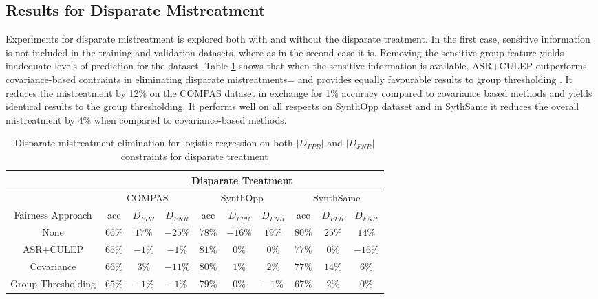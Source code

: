 \documentclass[runningheads]{llncs}
\begin{document}
\subsection{Results for Disparate Mistreatment}
Experiments for disparate mistreatment is explored both with and without the disparate treatment. In the first case, sensitive information is not included in the training and validation datasets, where as in the second case it is. Removing the sensitive group feature yields inadequate levels of prediction for the dataset. Table \ref{tab:disptreatmenttable} shows that when the sensitive information is available, ASR+CULEP outperforms covariance-based contraints in eliminating disparate mistreatments= and provides equally favourable results to group thresholding \cite{krasanakis2018adaptive}. It reduces the mistreatment by 12\% on the COMPAS dataset in exchange for 1\% accuracy compared to covariance based methods and yields identical results to the group thresholding. It performs well on all respects on SynthOpp dataset and in SythSame it reduces the overall mistreatment by 4\% when compared to covariance-based methods.\\
\begin{table}[!htbp]
      \centering
\begin{tabular}{|c|c|c|c|c|c|c|c|c|c|}
\hline
{} & \multicolumn{9}{c}{Disparate Treatment} \vline \\
\hline
{} & \multicolumn{3}{c|}{COMPAS} & \multicolumn{3}{c|}{SynthOpp} & \multicolumn{3}{c|}{SynthSame} \vline \\
\hline
Fairness Approach & acc & $D_{FPR}$ & $D_{FNR}$ & acc & $D_{FPR}$ & $D_{FNR}$ & acc & $D_{FPR}$ & $D_{FNR}$ \\
\hline
None & $66\%$ & $17\%$  & $-25\%$  & $78\%$  & $-16\%$  & $19\%$  & $80\%$  & $25\%$  & $14\%$  \\
\hline
ASR+CULEP & $65\%$ & $-1\%$  & $-1\%$  & $81\%$  & $0\%$  & $0\%$  & $77\%$  & $0\%$  & $-16\%$  \\
\hline
Covariance & $66\%$ & $3\%$  & $-11\%$  & $80\%$  & $1\%$  & $2\%$  & $77\%$  & $14\%$  & $6\%$  \\
\hline
Group Thresholding & $65\%$ & $-1\%$  & $-1\%$  & $79\%$  & $0\%$  & $-1\%$  & $67\%$  & $2\%$  & $0\%$  \\
\hline 
\end{tabular}
\\
\caption{Disparate mistreatment elimination for logistic regression on both $|D_{FPR}|$ and $|D_{FNR}|$ constraints for disparate treatment}
\label{tab:disptreatmenttable}
\end{table}
\end{document}
